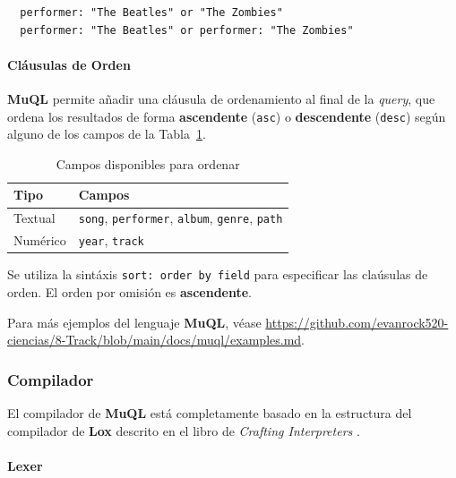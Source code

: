 \begin{lstlisting}
  performer: "The Beatles" or "The Zombies"
  performer: "The Beatles" or performer: "The Zombies"
\end{lstlisting}

\paragraph{Cláusulas de Orden}

\textbf{MuQL} permite añadir una cláusula de ordenamiento al final de la \textit{query}, que ordena
los resultados de forma \textbf{ascendente} (\texttt{asc}) o \textbf{descendente} (\texttt{desc})
según alguno de los campos de la Tabla~\ref{tab:sort-orders}.

\begin{table}[htbp]
	\centering
	\begin{tabular}{ll}
		\hline
		\textbf{Tipo} & \textbf{Campos}                                                                  \\
		\hline
		Textual       & \texttt{song}, \texttt{performer}, \texttt{album}, \texttt{genre}, \texttt{path} \\
		Numérico      & \texttt{year}, \texttt{track}                                                    \\
		\hline
	\end{tabular}
	\caption{Campos disponibles para ordenar}
	\label{tab:sort-orders}
\end{table}

Se utiliza la sintáxis \texttt{sort: order by field} para especificar las claúsulas de orden.
El orden por omisión es \textbf{ascendente}.

Para más ejemplos del lenguaje \textbf{MuQL}, véase
\url{https://github.com/evanrock520-ciencias/8-Track/blob/main/docs/muql/examples.md}.

\subsubsection*{Compilador}

El compilador de \textbf{MuQL} está completamente basado en la estructura del compilador de \textbf{Lox} descrito en el libro de \textit{Crafting Interpreters} \cite{nystrom2021crafting}.

\paragraph{Lexer}

